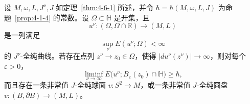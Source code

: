 \begin{lemma}\label{lem:4-6-5}
设 $M,\omega,L,J^\nu,J$ 如定理~\ref{thm:4-6-1} 所述，并令
$\hbar=\hbar(M,\omega,L,J)$ 为命题~\ref{prop:4-1-4} 的常数。设
$\Omega\subset\mathbb H$ 是开集，且
\[
  u^\nu:(\Omega,\Omega\cap\mathbb R)\longrightarrow(M,L)
\]
是一列满足
\[
  \sup_\nu E(u^\nu;\Omega)<\infty
\]
的 $J^\nu$-全纯曲线。若存在点列 $z^\nu\to z_0\in\Omega$，使得
$|du^\nu(z^\nu)|\to\infty$，则对每个 $\varepsilon>0$，
\begin{equation}\label{eq:4-6-1}
  \liminf_{\nu\to\infty}
  E\bigl(u^\nu;B_\varepsilon(z_0)\cap\mathbb H\bigr)
  \ge\hbar,
\end{equation}
而且存在一条非常值 $J$-全纯球面 $v:S^2\to M$，或一条非常值 $J$-全纯圆盘
$v:(B,\partial B)\to(M,L)$。
\end{lemma}

